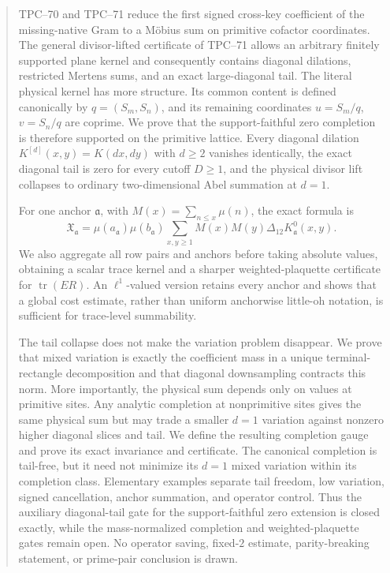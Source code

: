 \begin{abstract}
TPC--70 and TPC--71 reduce the first signed cross-key coefficient of the
missing-native Gram to a M\"obius sum on primitive cofactor coordinates.
The general divisor-lifted certificate of TPC--71 allows an arbitrary
finitely supported plane kernel and consequently contains diagonal
dilations, restricted Mertens sums, and an exact large-diagonal tail.  The
literal physical kernel has more structure.  Its common content is defined
canonically by \(q=(S_m,S_n)\), and its remaining coordinates
\(u=S_m/q\), \(v=S_n/q\) are coprime.  We prove that the support-faithful
zero completion is therefore supported on the primitive lattice.  Every
diagonal dilation \(K^{[d]}(x,y)=K(dx,dy)\) with \(d\ge2\) vanishes
identically, the exact diagonal tail is zero for every cutoff \(D\ge1\),
and the physical divisor lift collapses to ordinary two-dimensional Abel
summation at \(d=1\).

For one anchor \(\mathfrak a\), with
\(M(x)=\sum_{n\le x}\mu(n)\), the exact formula is
\[
 \mathfrak X_{\mathfrak a}
 =
 \mu(a_{\mathfrak a})\mu(b_{\mathfrak a})
 \sum_{x,y\ge1}
 M(x)M(y)\Delta_{12}K_{\mathfrak a}^{0}(x,y).
\]
We also aggregate all row pairs and anchors before taking absolute values,
obtaining a scalar trace kernel and a sharper weighted-plaquette
certificate for \(\operatorname{tr}(ER)\).  An
\(\ell^1\)-valued version retains every anchor and shows that a global
cost estimate, rather than uniform anchorwise little-oh notation, is
sufficient for trace-level summability.

The tail collapse does not make the variation problem disappear.  We
prove that mixed variation is exactly the coefficient mass in a unique
terminal-rectangle decomposition and that diagonal downsampling contracts
this norm.  More importantly, the physical sum depends only on values at
primitive sites.  Any analytic completion at nonprimitive sites gives the
same physical sum but may trade a smaller \(d=1\) variation against
nonzero higher diagonal slices and tail.  We define the resulting
completion gauge and prove its exact invariance and certificate.  The
canonical completion is tail-free, but it need not minimize its \(d=1\)
mixed variation within its completion class.  Elementary examples separate
tail freedom, low variation, signed cancellation, anchor summation, and
operator control.  Thus the auxiliary diagonal-tail gate for the
support-faithful zero extension is closed exactly, while the
mass-normalized completion and weighted-plaquette gates remain open.  No
operator saving, fixed-\(2\)
estimate, parity-breaking statement, or prime-pair conclusion is drawn.
\end{abstract}
